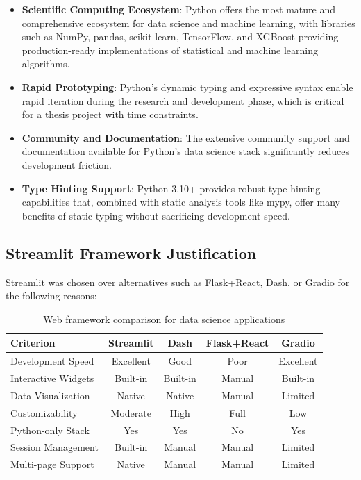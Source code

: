 \begin{itemize}
    \item \textbf{Scientific Computing Ecosystem}: Python offers the most mature and comprehensive ecosystem for data science and machine learning, with libraries such as NumPy, pandas, scikit-learn, TensorFlow, and XGBoost providing production-ready implementations of statistical and machine learning algorithms.
    
    \item \textbf{Rapid Prototyping}: Python's dynamic typing and expressive syntax enable rapid iteration during the research and development phase, which is critical for a thesis project with time constraints.
    
    \item \textbf{Community and Documentation}: The extensive community support and documentation available for Python's data science stack significantly reduces development friction.
    
    \item \textbf{Type Hinting Support}: Python 3.10+ provides robust type hinting capabilities that, combined with static analysis tools like mypy, offer many benefits of static typing without sacrificing development speed.
\end{itemize}

\subsection{Streamlit Framework Justification}

Streamlit was chosen over alternatives such as Flask+React, Dash, or Gradio for the following reasons:

\begin{table}[h]
\centering
\begin{tabular}{|l|c|c|c|c|}
\hline
\textbf{Criterion} & \textbf{Streamlit} & \textbf{Dash} & \textbf{Flask+React} & \textbf{Gradio} \\
\hline
Development Speed & Excellent & Good & Poor & Excellent \\
\hline
Interactive Widgets & Built-in & Built-in & Manual & Built-in \\
\hline
Data Visualization & Native & Native & Manual & Limited \\
\hline
Customizability & Moderate & High & Full & Low \\
\hline
Python-only Stack & Yes & Yes & No & Yes \\
\hline
Session Management & Built-in & Manual & Manual & Limited \\
\hline
Multi-page Support & Native & Manual & Manual & Limited \\
\hline
\end{tabular}
\caption{Web framework comparison for data science applications}
\label{tab:framework-comparison}
\end{table}

